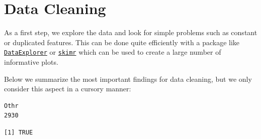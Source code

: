 \begin{Shaded}
\begin{Highlighting}[]
\OtherTok{=}\SpecialCharTok{::}
\end{Highlighting}
\end{Shaded}

\hypertarget{data-cleaning}{%
\section{Data Cleaning}\label{data-cleaning}}

As a first step, we explore the data and look for simple problems such
as constant or duplicated features. This can be done quite efficiently
with a package like
\href{https://cran.r-project.org/package=DataExplorer}{\texttt{DataExplorer}}
or \href{https://cran.r-project.org/package=skimr}{\texttt{skimr}} which
can be used to create a large number of informative plots.

Below we summarize the most important findings for data cleaning, but we
only consider this aspect in a cursory manner:

\begin{Shaded}
\begin{Highlighting}[]
\SpecialCharTok{$}
\end{Highlighting}
\end{Shaded}

\begin{verbatim}
Othr 
2930 
\end{verbatim}

\begin{Shaded}
\begin{Highlighting}[]
\SpecialCharTok{$}\SpecialCharTok{$}
\end{Highlighting}
\end{Shaded}

\begin{verbatim}
[1] TRUE
\end{verbatim}

\begin{Shaded}
\begin{Highlighting}[]
\SpecialCharTok{$}\SpecialCharTok{$}
\end{Highlighting}
\end{Shaded}

